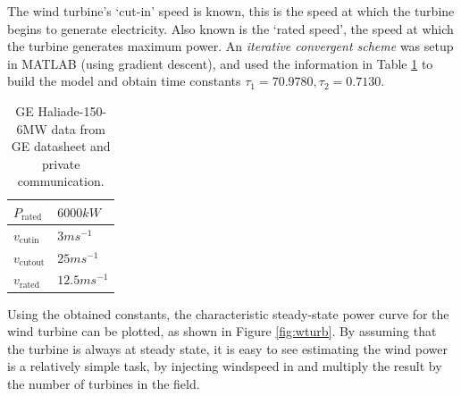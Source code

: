 The wind turbine's `cut-in' speed is known, this is the speed at which the turbine begins to generate electricity.
Also known is the `rated speed', the speed at which the turbine generates maximum power.
An \emph{iterative convergent scheme} was setup in MATLAB (using gradient descent), and used the information in Table \ref{tbl:haliade} to build the model and obtain time constants $\tau_1 = 70.9780,\tau_2 = 0.7130$.
%
\begin{table}[bh]
        \centering
        \begin{tabular}{||l | l||}
                \hline
                $P_{\text{rated}}$ & $6000kW$\\
                \hline
                $v_{\text{cutin}}$ & $3ms^{-1}$\\
                \hline
                $v_{\text{cutout}}$ & $25ms^{-1}$\\
                \hline
                $v_{\text{rated}}$ & $12.5ms^{-1}$\\
                \hline
        \end{tabular}
        \caption{GE Haliade-150-6MW data from GE datasheet and private communication. \cite{power:wturbdata}} \label{tbl:haliade}
\end{table}

Using the obtained constants, the characteristic steady-state power curve for the wind turbine can be plotted, as shown in Figure \ref{fig:wturb}.
By assuming that the turbine is always at steady state, it is easy to see estimating the wind power is a relatively simple task, by injecting windspeed in and multiply the result by the number of turbines in the field.

